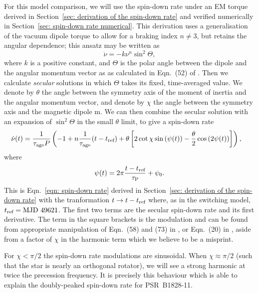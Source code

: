 \documentclass[../full_thesis/full_thesis.tex]{subfiles}
\begin{document}
For this model comparison, we will use the spin-down rate under an EM torque
derived in Section~\ref{sec: derivation of the spin-down rate} and verified
numerically in Section~\ref{sec: spin-down rate numerical}. This derivation uses a
generalisation of the vacuum dipole torque to
allow for a braking index $n\ne3$, but retains the angular dependence; this
ansatz may be written as
\begin{equation}
\dot{\nu} = -k\nu^{n}\sin^{2}\Theta,
\end{equation}
where $k$ is a positive constant, and $\Theta$ is the
polar angle between the dipole and the angular momentum vector as
as calculated in Eqn.~(52) of \citet{Jones2001}.
Then we calculate \emph{secular} solutions in which $\Theta$ takes its fixed, time-averaged
value. We denote by $\theta$  the angle between the symmetry axis of the
moment of inertia and the angular momentum vector, and denote by $\chi$ the
angle between the symmetry axis and the magnetic dipole m.  We can then combine
the secular solution with an expansion of $\sin^2 \Theta$ in the small
$\theta$ limit, to give a spin-down rate
\begin{align}
\begin{split}
\dot{\nu}(t) = \frac{1}{\tau_{\mathrm{age}} P}&\left(-1 + n\frac{1}{\tau_{\mathrm{age}}} (t-t_{\textrm{ref}})
 + \theta \left[
2\cot\chi\sin\left(\psi(t)\right) - \frac{\theta}{2}\cos\left(2\psi(t)\right)
\right]\right),
\end{split}
\label{eqn: precession nudot degen}
\end{align}
where
\begin{equation}
\psi(t)= 2\pi\frac{t-t_{\textrm{ref}}}{\tau_{\mathrm{P}}} + \psi_{0}.
\end{equation}
This is Eqn.~\ref{eqn: spin-down rate} derived in Section~\ref{sec: derivation of
the spin-down rate} with the tranformation $t \rightarrow t-t_{\textrm{ref}}$ where,
as in the switching model, $t_{\textrm{ref}}= \textrm{MJD } 49621$.
The first two terms are the secular spin-down rate and its first derivative.
The term in the square brackets is the modulation and can be found from appropriate
manipulation of Eqn.~(58) and (73) in \citet{Jones2001}, or Eqn.~(20) in
\citet{Link2001}, aside from a factor of $\chi$ in the harmonic term which we
believe to be a misprint.

For $\chi < \pi/2$ the spin-down rate modulations are sinusoidal. When $\chi
\approx \pi/2$ (such that the star is nearly an orthogonal rotator), we will
see a strong harmonic at twice the precession frequency. It is precisely this
behaviour which is able to explain the doubly-peaked spin-down rate for
PSR~B1828-11.
\end{document}
